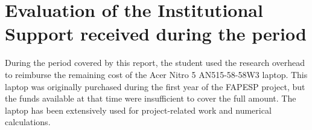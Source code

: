 \documentclass[12pt]{report}
\begin{document}
%
%

\chapter{Evaluation of the Institutional Support received during the period} \label{chp:apoioInst}

During the period covered by this report, the student used the research overhead to reimburse the remaining cost of the Acer Nitro 5 AN515-58-58W3 laptop. This laptop was originally purchased during the first year of the FAPESP project, but the funds available at that time were insufficient to cover the full amount. The laptop has been extensively used for project-related work and numerical calculations.
\end{document}
